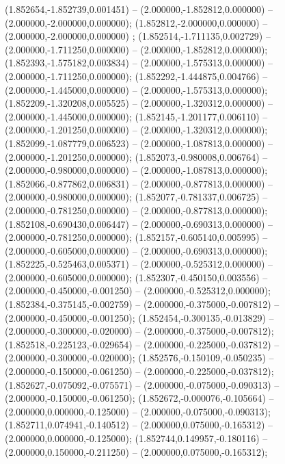  (1.852654,-1.852739,0.001451) -- (2.000000,-1.852812,0.000000) -- (2.000000,-2.000000,0.000000);
 (1.852812,-2.000000,0.000000) -- (2.000000,-2.000000,0.000000) ;
 (1.852514,-1.711135,0.002729) -- (2.000000,-1.711250,0.000000) -- (2.000000,-1.852812,0.000000);
 (1.852393,-1.575182,0.003834) -- (2.000000,-1.575313,0.000000) -- (2.000000,-1.711250,0.000000);
 (1.852292,-1.444875,0.004766) -- (2.000000,-1.445000,0.000000) -- (2.000000,-1.575313,0.000000);
 (1.852209,-1.320208,0.005525) -- (2.000000,-1.320312,0.000000) -- (2.000000,-1.445000,0.000000);
 (1.852145,-1.201177,0.006110) -- (2.000000,-1.201250,0.000000) -- (2.000000,-1.320312,0.000000);
 (1.852099,-1.087779,0.006523) -- (2.000000,-1.087813,0.000000) -- (2.000000,-1.201250,0.000000);
 (1.852073,-0.980008,0.006764) -- (2.000000,-0.980000,0.000000) -- (2.000000,-1.087813,0.000000);
 (1.852066,-0.877862,0.006831) -- (2.000000,-0.877813,0.000000) -- (2.000000,-0.980000,0.000000);
 (1.852077,-0.781337,0.006725) -- (2.000000,-0.781250,0.000000) -- (2.000000,-0.877813,0.000000);
 (1.852108,-0.690430,0.006447) -- (2.000000,-0.690313,0.000000) -- (2.000000,-0.781250,0.000000);
 (1.852157,-0.605140,0.005995) -- (2.000000,-0.605000,0.000000) -- (2.000000,-0.690313,0.000000);
 (1.852225,-0.525463,0.005371) -- (2.000000,-0.525312,0.000000) -- (2.000000,-0.605000,0.000000);
 (1.852307,-0.450150,0.003556) -- (2.000000,-0.450000,-0.001250) -- (2.000000,-0.525312,0.000000);
 (1.852384,-0.375145,-0.002759) -- (2.000000,-0.375000,-0.007812) -- (2.000000,-0.450000,-0.001250);
 (1.852454,-0.300135,-0.013829) -- (2.000000,-0.300000,-0.020000) -- (2.000000,-0.375000,-0.007812);
 (1.852518,-0.225123,-0.029654) -- (2.000000,-0.225000,-0.037812) -- (2.000000,-0.300000,-0.020000);
 (1.852576,-0.150109,-0.050235) -- (2.000000,-0.150000,-0.061250) -- (2.000000,-0.225000,-0.037812);
 (1.852627,-0.075092,-0.075571) -- (2.000000,-0.075000,-0.090313) -- (2.000000,-0.150000,-0.061250);
 (1.852672,-0.000076,-0.105664) -- (2.000000,0.000000,-0.125000) -- (2.000000,-0.075000,-0.090313);
 (1.852711,0.074941,-0.140512) -- (2.000000,0.075000,-0.165312) -- (2.000000,0.000000,-0.125000);
 (1.852744,0.149957,-0.180116) -- (2.000000,0.150000,-0.211250) -- (2.000000,0.075000,-0.165312);
